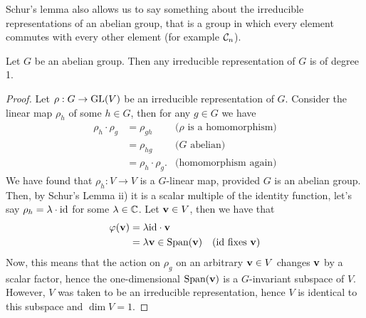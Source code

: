 Schur's lemma also allows us to say something about the irreducible representations of an abelian group, that is a group in which every element commutes with every other element (for example $\mathcal{C}_n$).

\begin{corollary}\label{cor:abelianirred}
	Let $G$ be an abelian group. Then any irreducible representation of $G$ is of degree 1.
\end{corollary}
\begin{proof}\cite[\textit{Mentioned in passing in} Sect.1.3.]{FultonHarris}
	Let $\rho: G \rightarrow \text{GL}(V)$ be an irreducible representation of $G$. Consider the linear map $\rho_h$ of some $h \in G$, then for any $g \in G$ we have
	\begin{align*}
		\rho_h \cdot \rho_g &= \rho_{gh} & \text{($\rho$ is a homomorphism)} \\
		&= \rho_{hg} & \text{($G$ abelian)} \\
		&= \rho_h \cdot \rho_g. & \text{(homomorphism again)}
	\end{align*}
	We have found that $\rho_h: V \rightarrow V$ is a $G$-linear map, provided $G$ is an abelian group. Then, by Schur's Lemma ii) it is a scalar multiple of the identity function, let's say $\rho_h = \lambda \cdot \text{id}$ for some $\lambda \in \mathbb{C}$. Let $\mathbf{v} \in V$, then we have that
	\begin{align*}
		\varphi(\mathbf{v}) &= \lambda \text{id} \cdot \mathbf{v} \\
		&= \lambda \mathbf{v} \in \text{Span}(\mathbf{v}) & \text{($\text{id}$ fixes $\mathbf{v}$)}
	\end{align*}
	Now, this means that the action on $\rho_g$ on an arbitrary $\mathbf{v} \in V$ changes $\mathbf{v}$ by a scalar factor, hence the one-dimensional $\text{Span}(\mathbf{v})$ is a $G$-invariant subspace of $V$. However, $V$ was taken to be an irreducible representation, hence $V$ is identical to this subspace and $\dim V = 1$.
\end{proof}


